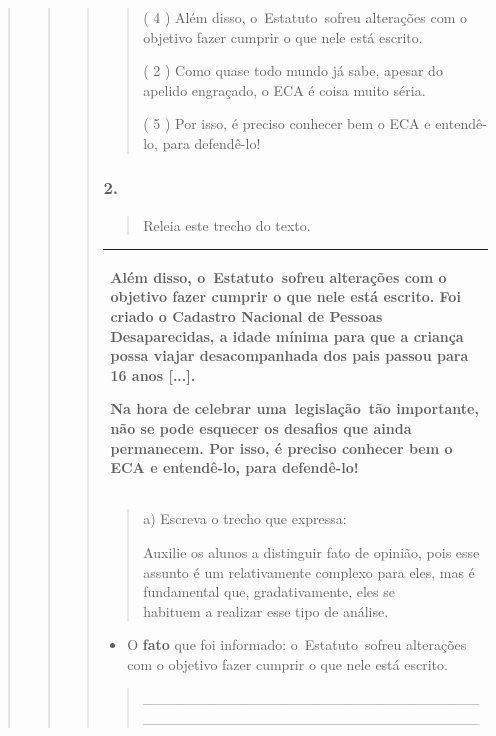 \begin{quote}
\begin{quote}
\begin{quote}
\begin{quote}
( 4 ) Além disso, o~Estatuto~sofreu alterações com o objetivo fazer
cumprir o que nele está escrito.

( 2 ) Como quase todo mundo já sabe, apesar do apelido engraçado, o ECA
é coisa muito séria.

( 5 ) Por isso, é preciso conhecer bem o ECA e entendê-lo, para
defendê-lo!
\end{quote}

\subsubsection{2. }\label{section-61}

\begin{quote}
Releia este trecho do texto.
\end{quote}

\begin{longtable}[]{@{}l@{}}
\toprule
\begin{minipage}[t]{0.97\columnwidth}\raggedright\strut
Além disso, o~Estatuto~sofreu alterações com o objetivo fazer cumprir o
que nele está escrito. Foi criado o Cadastro Nacional de Pessoas
Desaparecidas, a idade mínima para que a criança possa viajar
desacompanhada dos pais passou para 16 anos {[}...{]}.

Na hora de celebrar uma~legislação~tão importante, não se pode esquecer
os desafios que ainda permanecem. Por isso, é preciso conhecer bem o ECA
e entendê-lo, para defendê-lo!\strut
\end{minipage}\tabularnewline
\bottomrule
\end{longtable}

\begin{quote}
a) Escreva o trecho que expressa:

Auxilie os alunos a distinguir fato de opinião, pois esse assunto é um
relativamente complexo para eles, mas é\\
fundamental que, gradativamente, eles se\\
habituem a realizar esse tipo de análise.
\end{quote}

\begin{itemize}
\item
  O \textbf{fato} que foi informado: o~Estatuto~sofreu alterações com o
  objetivo fazer cumprir o que nele está escrito.
\end{itemize}

\begin{quote}
\_\_\_\_\_\_\_\_\_\_\_\_\_\_\_\_\_\_\_\_\_\_\_\_\_\_\_\_\_\_\_\_\_\_\_\_\_\_\_\_\_\_\_\_\_\_\_\_\_\_\_\_\_\_\_\_\_\_\_\_\_\_\_\_


\end{quote}
\end{quote}
\end{quote}
\end{quote}
